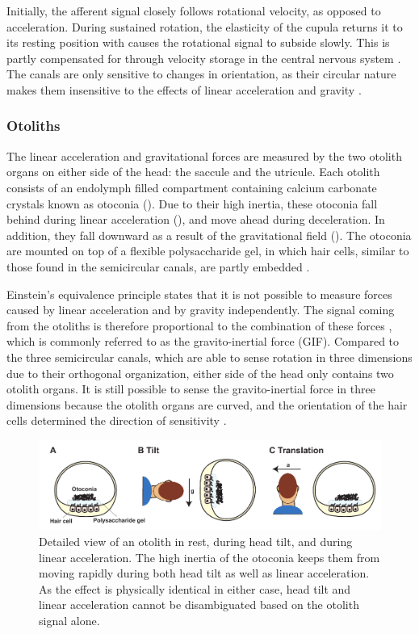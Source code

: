 Initially, the afferent signal closely follows rotational velocity, as opposed to acceleration. During sustained rotation, the elasticity of the cupula returns it to its resting position with causes the rotational signal to subside slowly. This is partly compensated for through velocity storage in the central nervous system \cite{goldberg2012}. The canals are only sensitive to changes in orientation, as their circular nature makes them insensitive to the effects of linear acceleration and gravity \cite{goldberg2012}. 


\subsubsection{Otoliths}
The linear acceleration and gravitational forces are measured by the two otolith organs on either side of the head: the saccule and the utricule. Each otolith consists of an endolymph filled compartment containing calcium carbonate crystals known as otoconia (). Due to their high inertia, these otoconia fall behind during linear acceleration (), and move ahead during deceleration. In addition, they fall downward as a result of the gravitational field (). The otoconia are mounted on top of a flexible polysaccharide gel, in which hair cells, similar to those found in the semicircular canals, are partly embedded \cite{goldberg2012}.  

Einstein's equivalence principle states that  it is not possible to measure forces caused by linear acceleration and by gravity independently. The signal coming from the otoliths is therefore proportional to the combination of these forces \cite{fernandez1976b}, which is commonly referred to as the gravito-inertial force (GIF). Compared to the three semicircular canals, which are able to sense rotation in three dimensions due to their orthogonal organization, either side of the head only contains two otolith organs. It is still possible to sense the gravito-inertial force in three dimensions because the otolith organs are curved, and the orientation of the hair cells determined the direction of sensitivity \cite{goldberg2012}.

\begin{figure}
    \includegraphics[width=1.0\textwidth]{src/intro/figures/otoliths.pdf}
    \caption{Detailed view of an otolith  in rest,  during head tilt, and  during linear acceleration. The high inertia of the otoconia keeps them from moving rapidly during both head tilt as well as linear acceleration. As the effect is physically identical in either case, head tilt and linear acceleration cannot be disambiguated based on the otolith signal alone.}
    \label{intro:fig:otoliths}
\end{figure}

